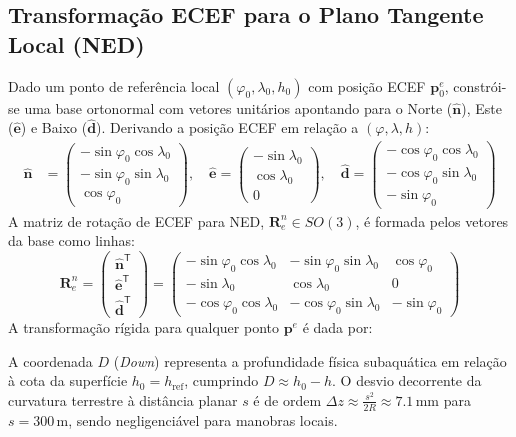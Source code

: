 \documentclass[11pt,a4paper]{article}
\newcommand{\vv}[1]{\mathbf{#1}}
\newcommand{\Rot}{\mathbf{R}}
\newcommand{\T}{^{\mathsf{T}}}
\theoremstyle{definition}
\newcommand{\caixaresultado}[1]{\begin{center}\fbox{\parbox{0.92\textwidth}{#1}}\end{center}}
\begin{document}
\subsection{Transformação ECEF para o Plano Tangente Local (NED)}
Dado um ponto de referência local $(\varphi_0, \lambda_0, h_0)$ com posição ECEF $\vv{p}_0^e$, constrói-se uma base ortonormal com vetores unitários apontando para o Norte ($\hat{\vv{n}}$), Este ($\hat{\vv{e}}$) e Baixo ($\hat{\vv{d}}$). Derivando a posição ECEF em relação a $(\varphi, \lambda, h)$:
\begin{align}
    \hat{\vv{n}} &= \begin{pmatrix} -\sin\varphi_0 \cos\lambda_0 \\ -\sin\varphi_0 \sin\lambda_0 \\ \cos\varphi_0 \end{pmatrix}, \quad
    \hat{\vv{e}} = \begin{pmatrix} -\sin\lambda_0 \\ \cos\lambda_0 \\ 0 \end{pmatrix}, \quad
    \hat{\vv{d}} = \begin{pmatrix} -\cos\varphi_0 \cos\lambda_0 \\ -\cos\varphi_0 \sin\lambda_0 \\ -\sin\varphi_0 \end{pmatrix}
\end{align}
A matriz de rotação de ECEF para NED, $\Rot_e^n \in SO(3)$, é formada pelos vetores da base como linhas:
\begin{equation}
\Rot_e^n = \begin{pmatrix} \hat{\vv{n}}\T \\ \hat{\vv{e}}\T \\ \hat{\vv{d}}\T \end{pmatrix} =
\begin{pmatrix}
-\sin\varphi_0\cos\lambda_0 & -\sin\varphi_0\sin\lambda_0 & \cos\varphi_0 \\
-\sin\lambda_0 & \cos\lambda_0 & 0 \\
-\cos\varphi_0\cos\lambda_0 & -\cos\varphi_0\sin\lambda_0 & -\sin\varphi_0
\end{pmatrix}
\end{equation}
A transformação rígida para qualquer ponto $\vv{p}^e$ é dada por:
\caixaresultado{
\begin{equation}
    \vv{p}^n = \begin{pmatrix} N \\ E \\ D \end{pmatrix} = \Rot_e^n \left( \vv{p}^e - \vv{p}_0^e \right)
\end{equation}
}
A coordenada $D$ (\textit{Down}) representa a profundidade física subaquática em relação à cota da superfície $h_0 = h_{\text{ref}}$, cumprindo $D \approx h_0 - h$. O desvio decorrente da curvatura terrestre à distância planar $s$ é de ordem $\Delta z \approx \frac{s^2}{2R} \approx 7.1\,\text{mm}$ para $s = 300\,\text{m}$, sendo negligenciável para manobras locais.
\end{document}
